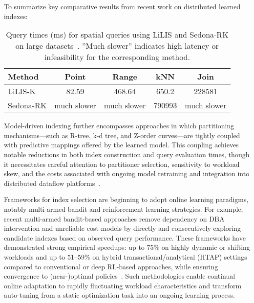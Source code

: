 \documentclass[sigconf]{acmart}
\begin{document}
To summarize key comparative results from recent work on distributed learned indexes:

\begin{table*}[htbp]
\centering
\caption{Query times (ms) for spatial queries using LiLIS and Sedona-RK on large datasets~\cite{ref111}. ''Much slower'' indicates high latency or infeasibility for the corresponding method.}
\label{tab:lilis_performance}
\begin{adjustbox}{max width=\textwidth}
\begin{tabular}{@{}lcccc@{}}
\toprule
Method & Point & Range & kNN & Join \\
\midrule
LiLIS-K & 82.59 & 468.64 & 650.2 & 228581 \\
Sedona-RK & much slower & much slower & 790993 & much slower \\
\bottomrule
\end{tabular}
\end{adjustbox}
\end{table*}

Model-driven indexing further encompasses approaches in which partitioning mechanisms—such as R-tree, k-d tree, and Z-order curves—are tightly coupled with predictive mappings offered by the learned model. This coupling achieves notable reductions in both index construction and query evaluation times, though it necessitates careful attention to partitioner selection, sensitivity to workload skew, and the costs associated with ongoing model retraining and integration into distributed dataflow platforms~\cite{ref110,ref111}.

Frameworks for index selection are beginning to adopt online learning paradigms, notably multi-armed bandit and reinforcement learning strategies. For example, recent multi-armed bandit-based approaches remove dependency on DBA intervention and unreliable cost models by directly and consecutively exploring candidate indexes based on observed query performance. These frameworks have demonstrated strong empirical speedups: up to 75\% on highly dynamic or shifting workloads and up to 51–59\% on hybrid transactional/analytical (HTAP) settings compared to conventional or deep RL-based approaches, while ensuring convergence to (near-)optimal policies~\cite{ref105}. Such methodologies enable continual online adaptation to rapidly fluctuating workload characteristics and transform auto-tuning from a static optimization task into an ongoing learning process.
\end{document}
